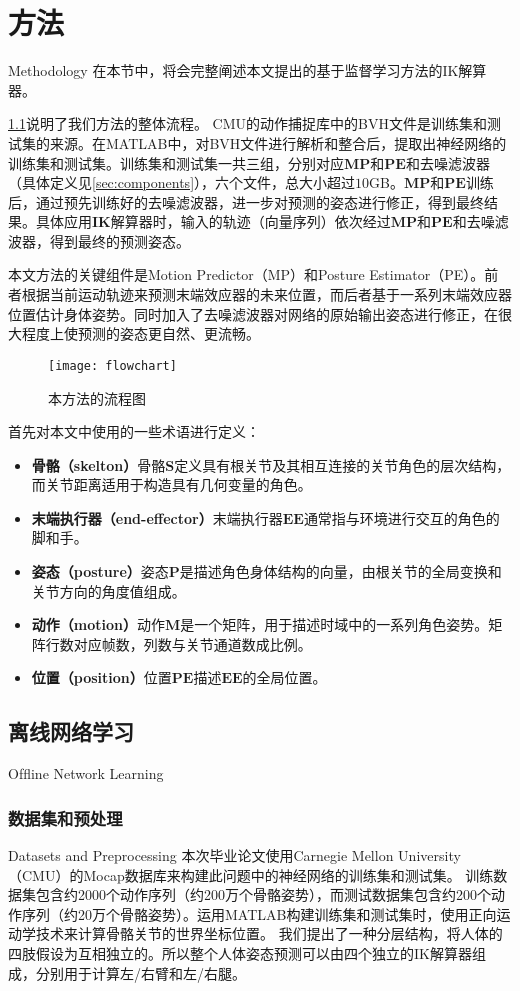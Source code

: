 \chapter{方法}{Methodology}
在本节中，将会完整阐述本文提出的基于监督学习方法的IK解算器。

\cref{fig:flowchart}说明了我们方法的整体流程。 CMU的动作捕捉库中的BVH文件是训练集和测试集的来源。在MATLAB中，对BVH文件进行解析和整合后，提取出神经网络的训练集和测试集。训练集和测试集一共三组，分别对应$\mathbf{MP}$和$\mathbf{PE}$和去噪滤波器（具体定义见\ref{sec:components}），六个文件，总大小超过$10$GB。$\mathbf{MP}$和$\mathbf{PE}$训练后，通过预先训练好的去噪滤波器，进一步对预测的姿态进行修正，得到最终结果。具体应用$\mathbf{IK}$解算器时，输入的轨迹（向量序列）依次经过$\mathbf{MP}$和$\mathbf{PE}$和去噪滤波器，得到最终的预测姿态。

本文方法的关键组件是Motion Predictor（MP）和Posture Estimator（PE）。前者根据当前运动轨迹来预测末端效应器的未来位置，而后者基于一系列末端效应器位置估计身体姿势。同时加入了去噪滤波器对网络的原始输出姿态进行修正，在很大程度上使预测的姿态更自然、更流畅。
\begin{figure}[!h]
	\centering
	\texttt{[image: flowchart]}
	\caption[]{\label{fig:flowchart}
		本方法的流程图
	}
\end{figure}

首先对本文中使用的一些术语进行定义：
\begin{itemize}
	\label{item:identify}
\item\textbf{骨骼（skelton）}骨骼$\mathbf{S}$定义具有根关节及其相互连接的关节角色的层次结构，而关节距离适用于构造具有几何变量的角色。
\item\textbf{末端执行器（end-effector）}末端执行器$\mathbf{EE}$通常指与环境进行交互的角色的脚和手。
\item\textbf{姿态（posture）}姿态$\mathbf{P}$是描述角色身体结构的向量，由根关节的全局变换和关节方向的角度值组成。
\item\textbf{动作（motion）}动作$\mathbf{M}$是一个矩阵，用于描述时域中的一系列角色姿势。矩阵行数对应帧数，列数与关节通道数成比例。
\item\textbf{位置（position）}位置$\mathbf{PE}$描述$\mathbf{EE}$的全局位置。
\end{itemize}

\section{离线网络学习}{Ofﬂine Network Learning}
\subsection{数据集和预处理}{Datasets and Preprocessing}
本次毕业论文使用Carnegie Mellon University（CMU）的Mocap数据库来构建此问题中的神经网络的训练集和测试集。 训练数据集包含约2000个动作序列（约200万个骨骼姿势），而测试数据集包含约200个动作序列（约20万个骨骼姿势）。运用MATLAB构建训练集和测试集时，使用正向运动学技术来计算骨骼关节的世界坐标位置。 我们提出了一种分层结构，将人体的四肢假设为互相独立的。所以整个人体姿态预测可以由四个独立的IK解算器组成，分别用于计算左/右臂和左/右腿。

